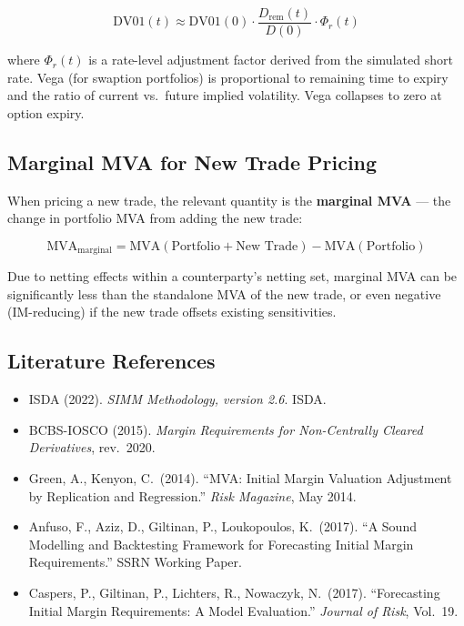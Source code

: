 \documentclass[11pt,a4paper]{article}
\begin{document}
\begin{equation}
\mathrm{DV01}(t) \approx \mathrm{DV01}(0)\cdot\frac{D_{\mathrm{rem}}(t)}{D(0)}\cdot\Phi_r(t)
\tag{6}
\end{equation}

where $\Phi_r(t)$ is a rate-level adjustment factor derived from the simulated short rate.
Vega (for swaption portfolios) is proportional to remaining time to expiry and the ratio of
current vs.\ future implied volatility. Vega collapses to zero at option expiry.

\subsection{Marginal MVA for New Trade Pricing}

When pricing a new trade, the relevant quantity is the \textbf{marginal MVA} --- the change in
portfolio MVA from adding the new trade:

\begin{equation}
\mathrm{MVA}_{\mathrm{marginal}} = \mathrm{MVA}(\text{Portfolio} + \text{New Trade}) - \mathrm{MVA}(\text{Portfolio})
\tag{7}
\end{equation}

Due to netting effects within a counterparty's netting set, marginal MVA can be significantly
less than the standalone MVA of the new trade, or even negative (IM-reducing) if the new trade
offsets existing sensitivities.

\subsection{Literature References}

\begin{itemize}[leftmargin=*]
  \item ISDA (2022). \textit{SIMM Methodology, version 2.6}. ISDA.
  \item BCBS-IOSCO (2015). \textit{Margin Requirements for Non-Centrally Cleared Derivatives}, rev.\ 2020.
  \item Green, A., Kenyon, C.\ (2014). ``MVA: Initial Margin Valuation Adjustment by Replication and Regression.'' \textit{Risk Magazine}, May 2014.
  \item Anfuso, F., Aziz, D., Giltinan, P., Loukopoulos, K.\ (2017). ``A Sound Modelling and Backtesting Framework for Forecasting Initial Margin Requirements.'' SSRN Working Paper.
  \item Caspers, P., Giltinan, P., Lichters, R., Nowaczyk, N.\ (2017). ``Forecasting Initial Margin Requirements: A Model Evaluation.'' \textit{Journal of Risk}, Vol.\ 19.
\end{itemize}
\end{document}
